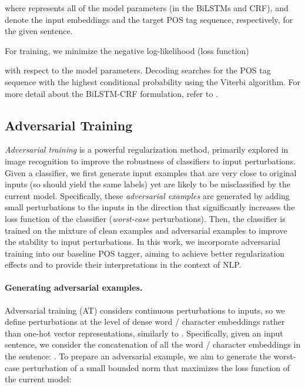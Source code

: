 \documentclass[11pt,a4paper]{article}
\newcommand{\veci}[1]{\mbox{\boldmath }}
\begin{document}
where \veci{\theta} represents all of the model parameters (in the BiLSTMs and CRF), \veci{s} and \veci{y} denote the input embeddings and the target POS tag sequence, respectively, for the given sentence. 

For training, we minimize the negative log-likelihood (loss function)

with respect to the model parameters.
Decoding searches for the POS tag sequence  with the highest conditional probability using the Viterbi algorithm.
For more detail about the BiLSTM-CRF formulation, refer to .


\subsection{Adversarial Training}
\label{sec:method:adv_training}
{\it Adversarial training} \cite{Goodfellow2015explain} is a powerful regularization method, primarily explored in
image recognition to improve the robustness of classifiers to input perturbations. 
Given a classifier, we first generate input examples that are very close to original inputs (so should yield the same labels) yet are likely to be misclassified by the current model.
Specifically, these {\it adversarial examples} are generated by adding small perturbations to the inputs in the direction that significantly increases the loss function
of the classifier ({\it worst-case} perturbations).
Then, the classifier is trained on the mixture of clean examples and adversarial examples to improve the stability to input perturbations.
In this work, we
incorporate adversarial training into our baseline POS tagger, aiming to achieve better regularization effects and to provide their interpretations in the context of NLP.



\paragraph{Generating adversarial examples.}

Adversarial training (AT) considers continuous perturbations to inputs, so
we define perturbations at the level of dense word / character embeddings rather than one-hot vector representations, similarly to .
Specifically, given an input sentence,
we consider the concatenation of all the word \!/\! character embeddings in the sentence: 
.
To prepare an adversarial example, we aim to generate the worst-case perturbation of a small bounded norm  that maximizes the loss function  of the current model:
\end{document}
